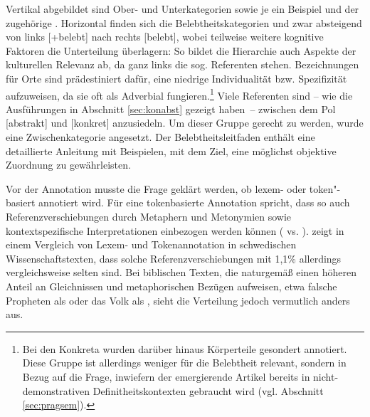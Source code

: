 Vertikal abgebildet sind Ober- und Unterkategorien sowie je ein Beispiel und der zugehörige . Horizontal finden sich die Belebtheitskategorien und zwar absteigend von links [+belebt] nach rechts [\textminus{}belebt],  wobei teilweise weitere kognitive Faktoren die Unterteilung überlagern: So bildet die Hierarchie auch Aspekte der kulturellen Relevanz ab, da ganz links die sog.  Referenten stehen. Bezeichnungen für Orte sind prädestiniert dafür, eine niedrige Individualität bzw. Spezifizität aufzuweisen, da sie oft als Adverbial fungieren.\footnote{Bei den Konkreta wurden darüber hinaus Körperteile gesondert annotiert. Diese Gruppe ist allerdings weniger für die Belebtheit relevant, sondern in Bezug auf die Frage, inwiefern der emergierende Artikel bereits in nicht-demonstrativen Definitheitskontexten gebraucht wird (vgl. Abschnitt \ref{sec:pragsem}).} Viele Referenten sind -- wie die Ausführungen in Abschnitt \ref{sec:konabst} gezeigt haben~-- zwischen dem Pol [abstrakt] und [konkret] anzusiedeln. Um dieser Gruppe gerecht zu werden, wurde eine Zwischenkategorie angesetzt. Der Belebtheitsleitfaden enthält eine detaillierte Anleitung mit Beispielen, mit dem Ziel, eine möglichst objektive Zuordnung zu gewährleisten.

Vor der Annotation musste die Frage geklärt werden, ob lexem- oder token"-basiert annotiert wird. Für eine tokenbasierte Annotation spricht, dass so auch Referenzverschiebungen durch Metaphern und Metonymien sowie kontextspezifische Interpretationen einbezogen werden können ( vs. ). \textcite{Ovrelid2009} zeigt in einem Vergleich von Lexem- und Tokenannotation in schwedischen Wissenschaftstexten, dass solche Referenzverschiebungen mit 1,1\%  allerdings vergleichsweise selten sind.  Bei biblischen Texten, die naturgemäß einen höheren Anteil an Gleichnissen und metaphorischen Bezügen aufweisen, etwa falsche Propheten als  oder das Volk als , sieht die Verteilung jedoch vermutlich anders aus. 

